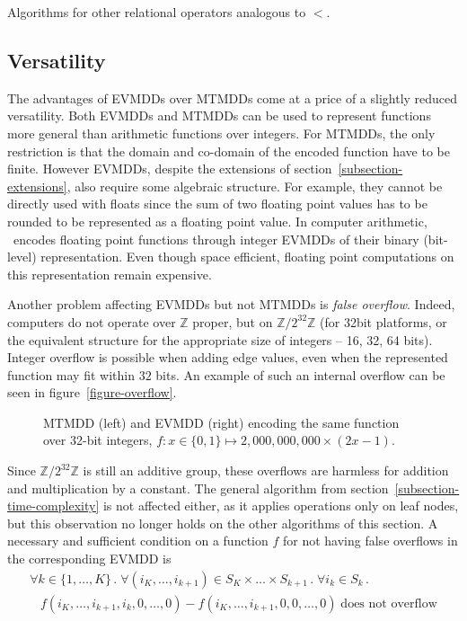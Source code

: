 \documentclass[nocover]             %
{NASA}                       %
\newcommand{\Z}{\mathbb{Z}}
\newcommand{\m}{\mbox}
\begin{document}
Algorithms for other relational operators analogous to $<$.

\subsection{Versatility}

The advantages of EVMDDs over MTMDDs come at a price of a slightly reduced versatility.
Both EVMDDs and MTMDDs can be used to represent functions more general than 
arithmetic functions over integers. For MTMDDs, the only restriction is that
the domain and co-domain of the encoded function have to be finite.
However EVMDDs, despite the extensions of section~\vref{subsection-extensions},
also require some algebraic structure. For example, they cannot be directly used
with floats since the sum of two floating point values has to be rounded to
be represented as a floating point value.
In computer arithmetic, \cite{Sasao2009}~encodes floating point functions
through integer EVMDDs of their binary (bit-level) representation. 
Even though space efficient, floating point computations on this representation remain expensive.

Another problem affecting EVMDDs but not MTMDDs is \emph{false overflow}.
Indeed, computers do not operate over $\Z$ proper, but on $\Z/2^{32}\Z$ (for 32bit platforms,
or the equivalent structure for the appropriate size of integers -- 16, 32, 64 bits).
Integer overflow is possible when adding edge values, even when the represented function
may fit within $32$ bits. An example of such an internal overflow
can be seen in figure~\vref{figure-overflow}.
\begin{figure}[htbp]
  \centering
    
  \caption{MTMDD (left) and EVMDD (right) encoding the same function over 32-bit integers,
$f : x \in \{0, 1\} \mapsto 2,000,000,000\times(2x-1)$.}
\label{figure-overflow}
\end{figure}
Since $\Z/2^{32}\Z$ is still an additive group, these overflows are harmless
for addition and multiplication by a constant. The general algorithm from 
section~\vref{subsection-time-complexity} is not affected either, as it applies
operations only on leaf nodes, but this observation no longer holds on 
the other algorithms of this section.
A necessary and sufficient condition on a function $f$ for not having false overflows in 
the corresponding EVMDD is
$$
\begin{array}{l}
\forall k \in \{1,\ldots, K\} \,.\; \forall (i_K,\ldots,i_{k+1}) \in S_K \times \ldots \times S_{k+1} \,.\; \forall i_k \in S_k \,.\;\\
\;\;\; f(i_K,\ldots, i_{k+1}, i_k, 0,\ldots, 0) - f(i_K,\ldots, i_{k+1}, 0, 0,\ldots, 0) \; \m{does not overflow}
\end{array}
$$
\end{document}
